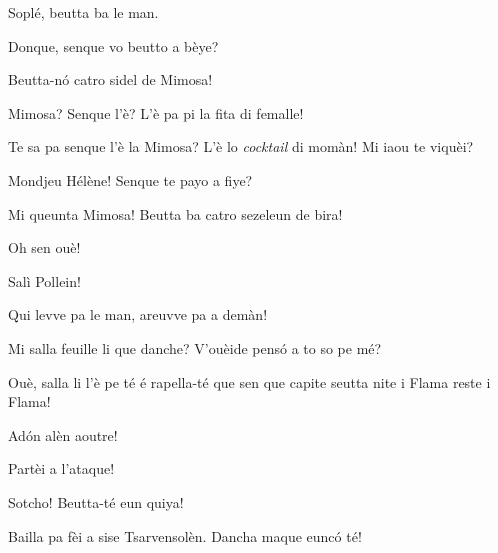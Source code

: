 \begin{drama}

\Bertaspeaks{} Soplé, beutta ba le man.

\Helenespeaks Donque, senque vo beutto a bèye?

\Marcospeaks{} Beutta-n\'o catro sidel de Mimosa!

\Helenespeaks Mimosa? Senque l'è? L'è pa pi la fita di femalle!

\Michelspeaks {} Te sa pa senque l'è la Mimosa? L'è lo \textit{cocktail} di momàn! Mi iaou te viquèi?

\Bertaspeaks Mondjeu Hélène! Senque te payo a fiye?

\Federicospeaks Mi queunta Mimosa! Beutta ba catro sezeleun de bira! 

\Helenespeaks Oh sen ouè!

\scene[-- Si le man!]


\Djspeaks Salì Pollein!


\Djspeaks Qui levve pa le man, areuvve pa a demàn!



\Giuliospeaks{} Mi salla feuille li que danche? V'ouèide pens\'o a to so pe mé?

\Marcospeaks Ouè, salla li l'è pe té é rapella-té que sen que capite seutta nite i Flama reste i Flama!

\Giuliospeaks Ad\'on alèn aoutre!

\Marcospeaks Partèi a l'ataque!


\Pierrespeaks{} Sotcho! Beutta-té eun quiya!


\Marcospeaks{} Bailla pa fèi a sise Tsarvensolèn. Dancha maque eunc\'o té!


\end{drama}

